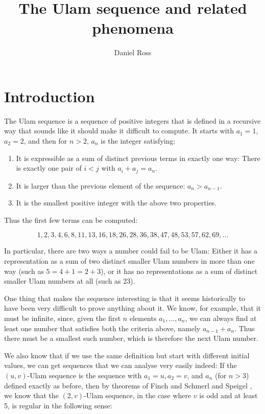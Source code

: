 \documentclass{article}
\title{The Ulam sequence and related phenomena}
\author{Daniel Ross}
\date{ }
\theoremstyle{definition}
\theoremstyle{remark}
\numberwithin{equation}{section}
\begin{document}
\maketitle

\tableofcontents

\section{Introduction}

The Ulam sequence is a sequence of positive integers that is defined
in a recursive way that sounds like it should make it difficult to
compute.  It starts with $a_1 = 1$, $a_2 = 2$, and then for $n > 2$,
$a_n$ is the integer satisfying: 
\begin{enumerate}
\item It is expressible as a sum of distinct previous terms in exactly
  one way: There is exactly one pair of $i < j$ with
  $a_i + a_j = a_n$.
\item It is larger than the previous element of the sequence: $a_n >
  a_{n-1}$.
\item It is the smallest positive integer with the above two
  properties.
\end{enumerate}

Thus the first few terms can be computed: 

\[1, 2, 3, 4, 6, 8, 11, 13, 16, 18, 26, 28, 36, 38, 47, 48, 53, 57, 62,
69, \ldots\]

In particular, there are two ways a number could fail to be Ulam:
Either it has a representation as a sum of two distinct smaller Ulam
numbers in more than one way (such as $5 = 4+1 = 2+3$), or it has no
representations as a sum of distinct smaller Ulam numbers at all (such
as 23).

One thing that makes the sequence interesting is that it seems
historically to have been very difficult to prove anything about it.
We know, for example, that it must be infinite, since, given the first
$n$ elements $a_1, \ldots, a_n$, we can always find at least one
number that satisfies both the criteria above, namely $a_{n-1} + a_n$.
Thus there must be a smallest such number, which is therefore the next
Ulam number.

We also know that if we use the same definition but start with
different initial values, we can get sequences that we can analyse
very easily indeed: If the $(u,v)$-Ulam sequence is the sequence with
$a_1 = u, a_2 = v$, and $a_n$ (for $n > 3$) defined exactly as before,
then by theorems of Finch \cite{cassaigne:em1995} and Schmerl and Speigel
\cite{schmerl:jct1994}, we know that the $(2,v)$-Ulam sequence, in the
case where $v$ is odd and at least 5, is regular in the following
sense:
\end{document}

